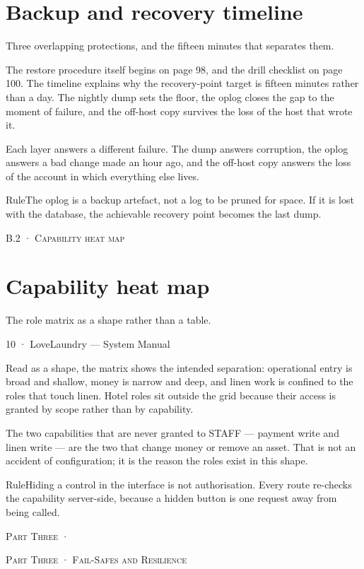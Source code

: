 \documentclass[11pt,a4paper,oneside]{book}
\begin{document}
\section*{Backup and recovery timeline}
Three overlapping protections, and the fifteen minutes that separates them.

The restore procedure itself begins on page 98, and the drill checklist on page 100. The timeline explains why the recovery-point target is fifteen minutes rather than a day. The nightly dump sets the floor, the oplog closes the gap to the moment of failure, and the off-host copy survives the loss of the host that wrote it.

Each layer answers a different failure. The dump answers corruption, the oplog answers a bad change made an hour ago, and the off-host copy answers the loss of the account in which everything else lives.

\begin{notebox}RuleThe oplog is a backup artefact, not a log to be pruned for space. If it is lost with the database, the achievable recovery point becomes the last dump.\end{notebox}
\textsc{\small\color{crimson}B.2 · Capability heat map}\par\medskip
\section*{Capability heat map}
The role matrix as a shape rather than a table.

10 · LoveLaundry — System Manual

Read as a shape, the matrix shows the intended separation: operational entry is broad and shallow, money is narrow and deep, and linen work is confined to the roles that touch linen. Hotel roles sit outside the grid because their access is granted by scope rather than by capability.

The two capabilities that are never granted to STAFF — payment write and linen write — are the two that change money or remove an asset. That is not an accident of configuration; it is the reason the roles exist in this shape.

\begin{notebox}RuleHiding a control in the interface is not authorisation. Every route re-checks the capability server-side, because a hidden button is one request away from being called.\end{notebox}
\textsc{\small\color{crimson}Part Three ·}\par\medskip
\textsc{\small\color{crimson}Part Three · Fail-Safes and Resilience}\par\medskip
\end{document}
